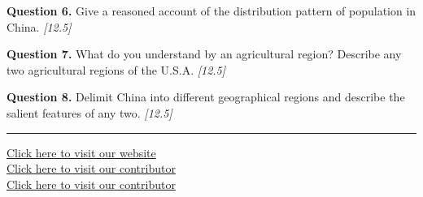 \documentclass[11pt,a4paper]{article}
\newcommand{\pts}[1]{\hfill   \textit{[#1]}}
\begin{document}
\medskip


\noindent   \textbf{Question 6.} Give a reasoned account of the distribution pattern of population in China. \pts{12.5}

\medskip


\noindent   \textbf{Question 7.} What do you understand by an agricultural region? Describe any two agricultural regions of the U.S.A. \pts{12.5}

\medskip


\noindent   \textbf{Question 8.} Delimit China into different geographical regions and describe the salient features of any two. \pts{12.5}

\vfill\rule{\linewidth}{0.4pt}

\begin{center}\small
\href{https://bhu-exam.vercel.app/}{Click here to visit our website}\\[4pt]
\href{https://me-aryan.vercel.app/}{Click here to visit our contributor}\\[4pt]
\href{https://quashan-me.vercel.app/}{Click here to visit our contributor}
\end{center}
\end{document}

